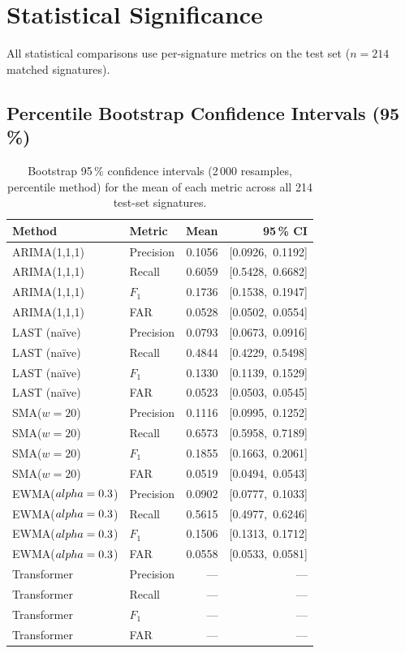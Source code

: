 \documentclass[11pt,a4paper]{article}
\begin{document}
\section{Statistical Significance}

All statistical comparisons use per-signature metrics on the test set
($n = 214$ matched signatures).


\subsection{Percentile Bootstrap Confidence Intervals (95\,\%)}

\begin{table}[H]
\centering
\caption{Bootstrap 95\,\% confidence intervals (2\,000 resamples, percentile
  method) for the mean of each metric across all 214 test-set signatures.}
\label{tab:ci}
\begin{tabular}{llrr}
\toprule
Method & Metric & Mean & 95\,\% CI \\
\midrule
  ARIMA(1,1,1) & Precision & 0.1056 & [0.0926,~0.1192] \\
  ARIMA(1,1,1) & Recall & 0.6059 & [0.5428,~0.6682] \\
  ARIMA(1,1,1) & $F_1$ & 0.1736 & [0.1538,~0.1947] \\
  ARIMA(1,1,1) & FAR & 0.0528 & [0.0502,~0.0554] \\
  LAST (na\"ive) & Precision & 0.0793 & [0.0673,~0.0916] \\
  LAST (na\"ive) & Recall & 0.4844 & [0.4229,~0.5498] \\
  LAST (na\"ive) & $F_1$ & 0.1330 & [0.1139,~0.1529] \\
  LAST (na\"ive) & FAR & 0.0523 & [0.0503,~0.0545] \\
  SMA($w=20$) & Precision & 0.1116 & [0.0995,~0.1252] \\
  SMA($w=20$) & Recall & 0.6573 & [0.5958,~0.7189] \\
  SMA($w=20$) & $F_1$ & 0.1855 & [0.1663,~0.2061] \\
  SMA($w=20$) & FAR & 0.0519 & [0.0494,~0.0543] \\
  EWMA($\\alpha=0.3$) & Precision & 0.0902 & [0.0777,~0.1033] \\
  EWMA($\\alpha=0.3$) & Recall & 0.5615 & [0.4977,~0.6246] \\
  EWMA($\\alpha=0.3$) & $F_1$ & 0.1506 & [0.1313,~0.1712] \\
  EWMA($\\alpha=0.3$) & FAR & 0.0558 & [0.0533,~0.0581] \\
  Transformer & Precision & --- & --- \\
  Transformer & Recall & --- & --- \\
  Transformer & $F_1$ & --- & --- \\
  Transformer & FAR & --- & --- \\
\bottomrule
\end{tabular}
\end{table}
\end{document}
